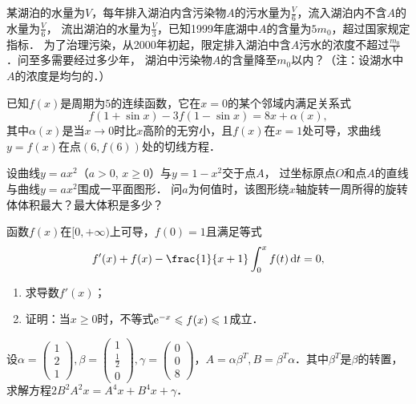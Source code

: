 \documentclass[plain,noanswer,medmath]{../../template/jnuexam}
\begin{document}

\begin{problem}
某湖泊的水量为$V$，每年排入湖泊内含污染物$A$的污水量为$\frac{V}{6}$，流入湖泊内不含$A$的水量为$\frac{V}{6}$，
流出湖泊的水量为$\frac{V}{3}$，已知1999年底湖中$A$的含量为$5m_0$，超过国家规定指标．
为了治理污染，从2000年初起，限定排入湖泊中含$A$污水的浓度不超过$\frac{m_0}{V}$．问至多需要经过多少年，
湖泊中污染物$A$的含量降至$m_0$以内？（注：设湖水中$A$的浓度是均匀的．）
\end{problem}






\begin{problem}
已知$f(x)$是周期为$5$的连续函数，它在$x = 0$的某个邻域内满足关系式
$$f(1 + \sin x) - 3f(1 - \sin x) = 8x + \alpha(x),$$
其中$\alpha (x)$是当$x \to 0$时比$x$高阶的无穷小，且$f(x)$在$x = 1$处可导，求曲线$y = f(x)$在点$(6,f(6))$处的切线方程．
\end{problem}



\begin{problem}
设曲线$y = ax^2$（$a > 0$, $x \ge 0$）与$y = 1 - x^2$交于点$A$，
过坐标原点$O$和点$A$的直线与曲线$y = ax^2$围成一平面图形．
问$a$为何值时，该图形绕$x$轴旋转一周所得的旋转体体积最大？最大体积是多少？
\end{problem}



\begin{problem}
函数$f(x)$在$[0, +\infty)$上可导，$f(0) = 1$且满足等式
$$f'(x) + f(x) - \frac{1}{x + 1}\int_0^x f(t)\dt = 0,$$
\begin{enumerate}
\item 求导数$f'(x)$；
\item 证明：当$x \ge 0$时，不等式$\mathrm{e}^{- x} \leqslant f(x) \leqslant 1$成立．
\end{enumerate}
\end{problem}



\begin{problem}
设$\alpha = \begin{pmatrix}
  1 \\
  2 \\
  1
\end{pmatrix},\beta = \begin{pmatrix}
  1 \\
  \frac{1}{2} \\
  0
\end{pmatrix},\gamma = \begin{pmatrix}
  0 \\
  0 \\
  8
\end{pmatrix}$，$A = \alpha \beta^T,B = \beta^T\alpha$．其中$\beta^T$是$\beta$的转置，
求解方程$2B^2A^2 x = A^4 x + B^4 x + \gamma$．
\end{problem}
\end{document}
